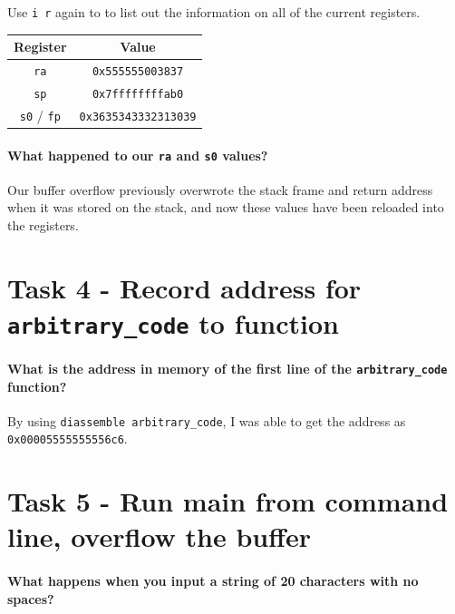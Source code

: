 \documentclass[12pt, letterpaper]{article}
\begin{document}
Use \texttt{i r} again to to list out the information on all of the current registers.

\begin{table}[h]
    \begin{center}
        \begin{tabular}{|c|c|}
            \hline
            \textbf{Register} & \textbf{Value} \\
            \hline
            \texttt{ra} & \texttt{0x555555003837} \\
            \hline
            \texttt{sp} & \texttt{0x7ffffffffab0} \\
            \hline
            \texttt{s0} / \texttt{fp} & \texttt{0x3635343332313039} \\
            \hline
        \end{tabular}
    \end{center}
\end{table}

\subsection*{What happened to our \texttt{ra} and \texttt{s0} values?}

Our buffer overflow previously overwrote the stack frame and return address when it was stored on the stack, and now these values have been reloaded into the registers.

\part*{Task 4 - Record address for \texttt{arbitrary\_code} to function}

\subsection*{What is the address in memory of the first line of the \texttt{arbitrary\_code} function?}

By using \texttt{diassemble arbitrary\_code}, I was able to get the address as \texttt{0x00005555555556c6}.

\part*{Task 5 - Run main from command line, overflow the buffer}

\subsection*{What happens when you input a string of 20 characters with no spaces?}
\end{document}
